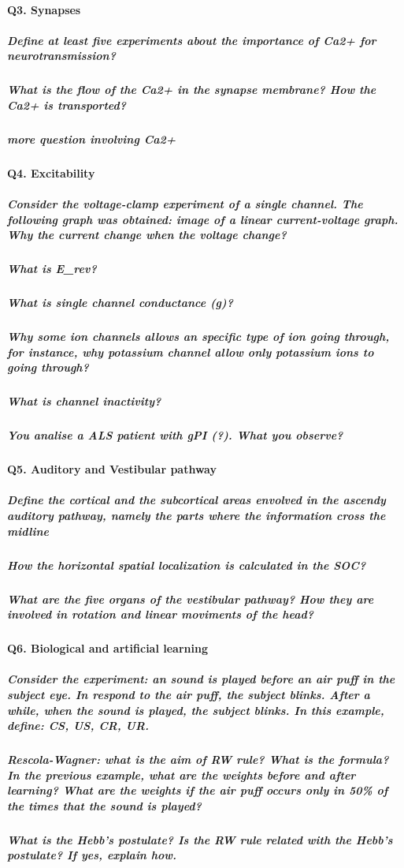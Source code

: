 \documentclass[12pt,article,oneside,a4paper]{memoir}
\begin{document}
\paragraph{Q3. Synapses}
\subparagraph{Define at least five experiments about the importance of Ca2+ for neurotransmission?}
\subparagraph{What is the flow of the Ca2+ in the synapse membrane? How the Ca2+ is transported?}
\subparagraph{more question involving Ca2+}
\paragraph{Q4. Excitability}
\subparagraph{Consider the voltage-clamp experiment of a single channel. The following graph was obtained: image of a linear current-voltage graph. Why the current change when the voltage change?}
\subparagraph{What is E\_{rev}?}
\subparagraph{What is single channel conductance (g)?}
\subparagraph{Why some ion channels allows an specific type of ion going through, for instance, why potassium channel allow only potassium ions to going through?}
\subparagraph{What is channel inactivity?}
\subparagraph{You analise a ALS patient with gPI (?). What you observe?}
\paragraph{Q5. Auditory and Vestibular pathway}
\subparagraph{Define the cortical and the subcortical areas envolved in the ascendy auditory pathway, namely the parts where the information cross the midline}
\subparagraph{How the horizontal spatial localization is calculated in the SOC?}
\subparagraph{What are the five organs of the vestibular pathway? How they are involved in rotation and linear moviments of the head?}
\paragraph{Q6. Biological and artificial learning}
\subparagraph{Consider the experiment: an sound is played before an air puff in the subject eye. In respond to the air puff, the subject blinks. After a while, when the sound is played, the subject blinks. In this example, define: CS, US, CR, UR.}
\subparagraph{Rescola-Wagner: what is the aim of RW rule? What is the formula? In the previous example, what are the weights before and after learning? What are the weights if the air puff occurs only in 50\% of the times that the sound is played?}
\subparagraph{What is the Hebb's postulate? Is the RW rule related with the Hebb's postulate? If yes, explain how. }
\end{document}
